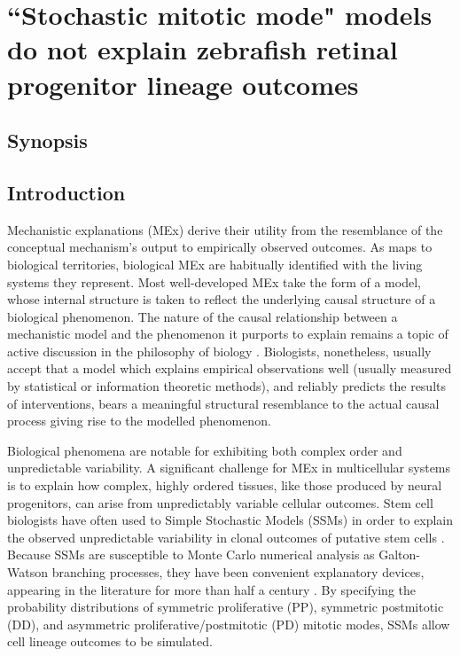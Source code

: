 \chapter{``Stochastic mitotic mode" models do not explain zebrafish retinal progenitor lineage outcomes}
\label{chap:SMME}

\section*{Synopsis}
\textit{}

\section{Introduction}

Mechanistic explanations (MEx) derive their utility from the resemblance of the conceptual mechanism's output to empirically observed outcomes. As maps to biological territories, biological MEx are habitually identified with the living systems they represent. Most well-developed MEx take the form of a model, whose internal structure is taken to reflect the underlying causal structure of a biological phenomenon. The nature of the causal relationship between a mechanistic model and the phenomenon it purports to explain remains a topic of active discussion in the philosophy of biology \cite{Fagan2015}. Biologists, nonetheless, usually accept that a model which explains empirical observations well (usually measured by statistical or information theoretic methods), and reliably predicts the results of interventions, bears a meaningful structural resemblance to the actual causal process giving rise to the modelled phenomenon.

Biological phenomena are notable for exhibiting both complex order and unpredictable variability. A significant challenge for MEx in multicellular systems is to explain how complex, highly ordered tissues, like those produced by neural progenitors, can arise from unpredictably variable cellular outcomes. Stem cell biologists have often used to Simple Stochastic Models (SSMs) in order to explain the observed unpredictable variability in clonal outcomes of putative stem cells \cite{Fagan2013}. Because SSMs are susceptible to Monte Carlo numerical analysis as Galton-Watson branching processes, they have been convenient explanatory devices, appearing in the literature for more than half a century \cite{Till1964}. By specifying the probability distributions of symmetric proliferative (PP), symmetric postmitotic (DD), and asymmetric proliferative/postmitotic (PD) mitotic modes, SSMs allow cell lineage outcomes to be simulated.

